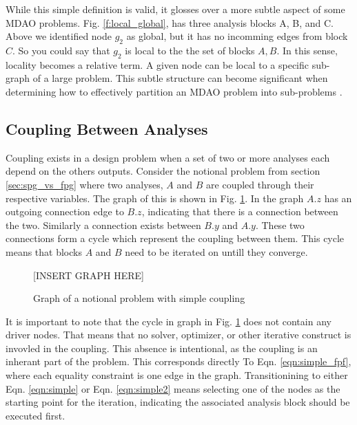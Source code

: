   While this simple definition is valid, it glosses over a more subtle aspect of 
  some MDAO problems. Fig. \ref{f:local_global}, has three analysis 
  blocks A, B, and C. Above we identified node $g_2$ as global,  but
  it has no incomming edges from block $C$. So you could say that $g_2$ is 
  local to the the set of blocks $A,B$. In this sense, locality 
  becomes a relative term. A given node can be local to a specific sub-graph of a large
  problem. This subtle structure can become significant when determining how to 
  effectively partition an MDAO problem into sub-problems 
  \cite{krishnamachari1997optimal,allison2009optimal,michelena1997hypergraph}.

\subsection{Coupling Between Analyses}

  Coupling exists in a design problem when a set of two or more analyses each depend on the
  others outputs. Consider the notional problem from section \ref{sec:spg_vs_fpg} where two 
  analyses, $A$ and $B$ are coupled through their respective variables. The graph of this 
  is shown in Fig. \ref{f:coupling}. In the graph $A.z$ has an outgoing connection 
  edge to $B.z$, indicating that there is a connection between the two. 
  Similarly a connection exists between $B.y$ and $A.y$. These two connections form 
  a cycle which represent the coupling between them. This cycle means that blocks $A$ and $B$ need
  to be iterated on untill they converge. 

  \begin{figure}
      \begin{center}
      [INSERT GRAPH HERE]
      \caption{Graph of a notional problem with simple coupling \label{f:coupling}}
      \end{center}
  \end{figure}

  It is important to note that the cycle in graph in Fig. \ref{f:coupling} does not contain 
  any driver nodes. That means that no solver, optimizer, or other iterative construct is 
  invovled in the coupling. This absence is intentional, as the coupling is an inherant part 
  of the problem. This corresponds directly To Eqn. \ref{eqn:simple_fpf}, where 
  each equality constraint is one edge in the graph. Transitionining to either 
  Eqn. \ref{eqn:simple} or Eqn. \ref{eqn:simple2} means selecting one of the nodes as the starting point 
  for the iteration, indicating the associated analysis block should be executed first. 

